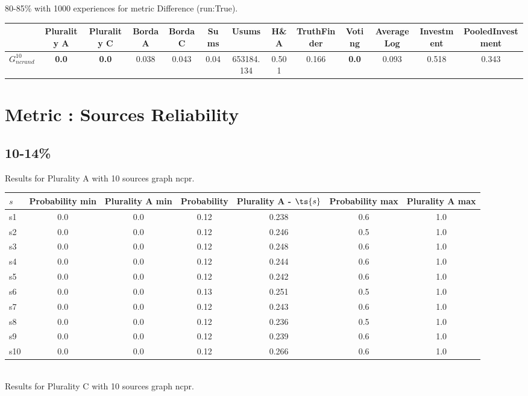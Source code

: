 \documentclass{article}
\newcommand{\graph}[2]{$G_{#1}^{#2}$}
\begin{document}
80-85\% with 1000 experiences for metric Difference (run:True).

\noindent\begin{tabular}{|l|c|c|c|c|c|c|c|c|c|c|c|c|}
\hline
& Plurality A& Plurality C& Borda A& Borda C& Sums& Usums& H\&A& TruthFinder& Voting& AverageLog& Investment& PooledInvestment\\
\hline
\graph{ncrand}{10} &\textbf{0.0}&\textbf{0.0}&0.038&0.043&0.04&653184.134&0.501&0.166&\textbf{0.0}&0.093&0.518&0.343\\
\hline
\end{tabular}
\newpage
\newpage
\section{Metric : Sources Reliability}

\newpage
\newpage

\subsection{10-14\%}

\noindent Results for Plurality A with 10 sources graph ncpr.

\noindent\begin{tabular}{|l|c|c|c|c|c|c|}
\hline
$s$& Probability min & Plurality A min & Probability & Plurality A - $\ts{s}$ & Probability max & Plurality A max\\
\hline
s1 &0.0 & 0.0 & 0.12 & 0.238 & 0.6 & 1.0\\
\hline
s2 &0.0 & 0.0 & 0.12 & 0.246 & 0.5 & 1.0\\
\hline
s3 &0.0 & 0.0 & 0.12 & 0.248 & 0.6 & 1.0\\
\hline
s4 &0.0 & 0.0 & 0.12 & 0.244 & 0.6 & 1.0\\
\hline
s5 &0.0 & 0.0 & 0.12 & 0.242 & 0.6 & 1.0\\
\hline
s6 &0.0 & 0.0 & 0.13 & 0.251 & 0.5 & 1.0\\
\hline
s7 &0.0 & 0.0 & 0.12 & 0.243 & 0.6 & 1.0\\
\hline
s8 &0.0 & 0.0 & 0.12 & 0.236 & 0.5 & 1.0\\
\hline
s9 &0.0 & 0.0 & 0.12 & 0.239 & 0.6 & 1.0\\
\hline
s10 &0.0 & 0.0 & 0.12 & 0.266 & 0.6 & 1.0\\
\hline
\end{tabular}\\

\noindent Results for Plurality C with 10 sources graph ncpr.
\end{document}
